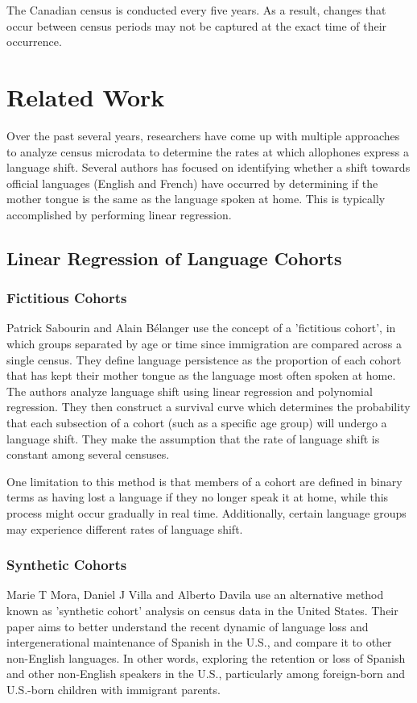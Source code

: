 \documentclass[10pt, conference, compsocconf]{IEEEtran}
\begin{document}
The Canadian census is conducted every five years. As a result, changes that occur between census periods may not be captured at the exact time of their occurrence.


\section{Related Work}
Over the past several years, researchers have come up with multiple approaches to analyze census microdata to determine the rates at which allophones express a language shift. Several authors has focused on identifying whether a  shift towards official languages (English and French) have occurred by determining if the mother tongue is the same as the language spoken at home. This is typically accomplished by performing linear regression.

\subsection{Linear Regression of Language Cohorts}
\subsubsection{Fictitious Cohorts}
Patrick Sabourin and Alain Bélanger use the concept of a 'fictitious cohort', in which groups separated by age or time since immigration are compared across a single census. They define language persistence as the proportion of each cohort that has kept their mother tongue as the language most often spoken at home. The authors analyze language shift using linear regression and polynomial regression. They then construct a survival curve which determines the probability that each subsection of a cohort (such as a specific age group) will undergo a language shift. They make the assumption that the rate of language shift is constant among several censuses.
\cite{dynamics1}

One limitation to this method is that members of a cohort are defined in binary terms as having lost a language if they no longer speak it at home, while this process might occur gradually in real time. Additionally, certain language groups may experience different rates of language shift. \cite{dynamics1}

\subsubsection{Synthetic Cohorts}
Marie T Mora, Daniel J Villa and Alberto Davila use an alternative method known as 'synthetic cohort' analysis on census data in the United States. Their paper aims to better understand the recent dynamic of language loss and intergenerational maintenance of Spanish in the U.S., and compare it to other non-English languages. In other words, exploring the retention or loss of Spanish and other non-English speakers in the U.S., particularly among foreign-born and U.S.-born children with immigrant parents. \cite{spanish1}
\end{document}
